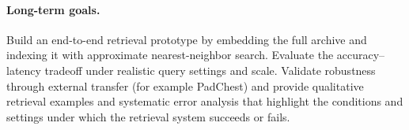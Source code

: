\documentclass[11pt,a4paper]{article}
\begin{document}
\paragraph{Long-term goals.}
Build an end-to-end retrieval prototype by embedding the full archive and indexing it with approximate nearest-neighbor search. Evaluate the accuracy--latency tradeoff under realistic query settings and scale. Validate robustness through external transfer (for example PadChest) and provide qualitative retrieval examples and systematic error analysis that highlight the conditions and settings under which the retrieval system succeeds or fails.



\end{document}
